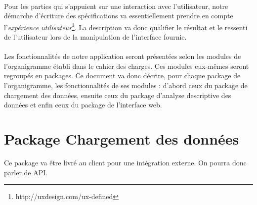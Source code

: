 		\paragraph{}Pour les parties qui s'appuient sur une interaction avec l'utilisateur, notre démarche d'écriture des spécifications va essentiellement prendre en compte l'\textit{expérience utilisateur}\footnote{http://uxdesign.com/ux-defined}. La description va donc qualifier le résultat et le ressenti de l'utilisateur lors de la manipulation de l'interface fournie.
		\paragraph{}Les fonctionnalités de notre application seront présentées selon les modules de l'organigramme établi dans le cahier des charges. Ces modules eux-mêmes seront regroupés en packages. Ce document va donc décrire, pour chaque package de l'organigramme, les fonctionnalités de ses modules : d'abord ceux du package de chargement des données, ensuite ceux du package d'analyse descriptive des données et enfin ceux du package de l'interface web.
		
	\section{Package Chargement des données}
	Ce package va être livré au client pour une intégration externe. On pourra donc parler de API.
		
